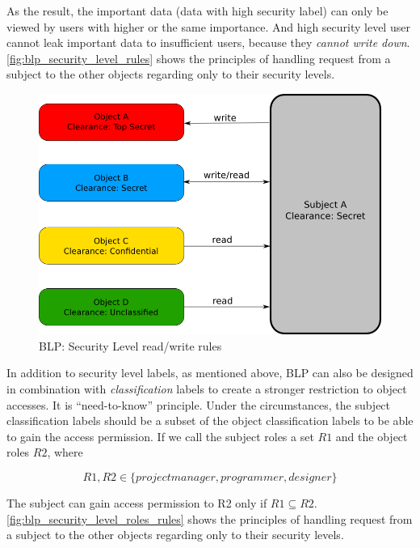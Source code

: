 As the result, the important data (data with high security label) can only be viewed by users with higher or the same importance.
And high security level user cannot leak important data to insufficient users, because they \emph{cannot write down}. 
\autoref{fig:blp_security_level_rules} shows the principles of handling request from a subject to the other objects regarding only to their security levels.

\begin{figure}[bth]
\myfloatalign
\includegraphics[width=1.0\linewidth]{gfx/chapter_2/blp_security_level_rules}
\caption[BLP: Security Level rules]{BLP: Security Level read/write rules}
\label{fig:blp_security_level_rules}
\end{figure}

In addition to security level labels, as mentioned above, BLP can also be designed in combination with \emph{classification} labels to create a stronger restriction to object accesses.
It is ``need-to-know'' principle.
Under the circumstances, the subject classification labels should be a subset of the object classification labels to be able to gain the access permission.
If we call the subject roles a set $R1$ and the object roles $R2$, where

$$R1, R2 \in \{project manager, programmer, designer\}$$ 

The subject can gain access permission to R2 only if $R1 \subseteq R2$.
\autoref{fig:blp_security_level_roles_rules} shows the principles of handling request from a subject to the other objects regarding only to their security levels.

